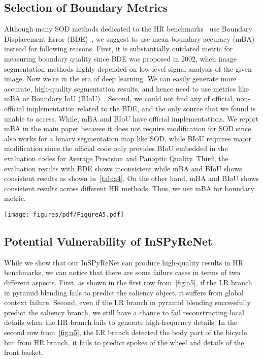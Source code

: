 \documentclass{llncs}
\begin{document}
\subsection{Selection of Boundary Metrics}
Although many SOD methods dedicated to the HR benchmarks~\cite{zeng2019towards,tang2021disentangled,xie2022pyramid} use Boundary Displacement Error (BDE)~\cite{freixenet2002yet}, 
we suggest to use mean boundary accuracy (mBA)~\cite{cheng2020cascadepsp} instead for following reasons.
First, it is substantially outdated metric for measuring boundary quality since BDE was proposed in 2002, when image segmentation methods highly depended on low-level signal analysis of the given image.
Now we're in the era of deep learning. We can easily generate more accurate, high-quality segmentation results, and hence need to use metrics like mBA or Boundary IoU (BIoU)~\cite{cheng2021boundary}.
Second, we could not find any of official, non-official implementation related to the BDE, and the only source that we found is unable to access.
While, mBA and BIoU have official implementations. 
We report mBA in the main paper because it does not require modification for SOD since~\cite{cheng2020cascadepsp} also works for a binary segmentation map like SOD, 
while BIoU requires major modification since the official code only provides BIoU embedded in the evaluation codes for Average Precision and Panoptic Quality.
Third, the evaluation results with BDE shows inconsistent while mBA and BIoU shows consistent results as shown in~\cref{tab:a4}.
On the other hand, mBA and BIoU shows consistent results across different HR methods. Thus, we use mBA for boundary metric.


\begin{figure*}
    \centering
    \texttt{[image: figures/pdf/FigureA5.pdf]} 
    \caption{Visual illustration for the failure case (first row: global context failure, second row: local detail failure) of InSPyReNet. \textit{Best viewed by zooming in.}}
    \label{fig:a5}
\end{figure*} 
\subsection{Potential Vulnerability of InSPyReNet}
While we show that our InSPyReNet can produce high-quality results in HR benchmarks, we can notice that there are some failure cases in terms of two different aspects.
First, as shown in the first row from~\cref{fig:a5}, if the LR branch in pyramid blending fails to predict the saliency object, it suffers from global context failure.
Second, even if the LR branch in pyramid blending successfully predict the saliency branch, we still have a chance to fail reconstructing local details when the HR branch fails to generate high-frequency details.
In the second row from~\cref{fig:a5}, the LR branch detected the body part of the bicycle, but from HR branch, it fails to predict spokes of the wheel and details of the front basket.
 
\end{document}

